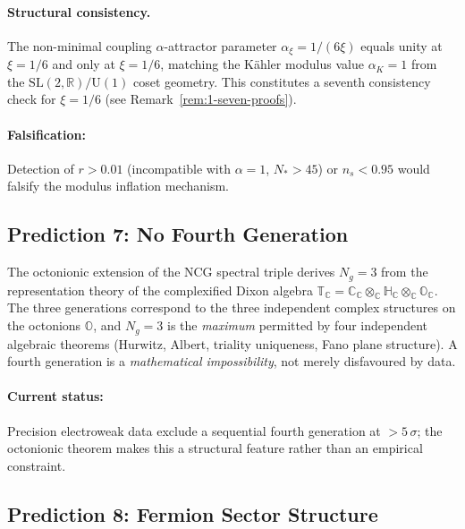\paragraph{Structural consistency.} The non-minimal coupling $\alpha$-attractor parameter $\alpha_\xi = 1/(6\xi)$ equals unity at $\xi = 1/6$ and only at $\xi = 1/6$, matching the K\"ahler modulus value $\alpha_K = 1$ from the $\mathrm{SL}(2,\mathbb{R})/\mathrm{U}(1)$ coset geometry. This constitutes a seventh consistency check for $\xi = 1/6$ (see Remark~\ref{rem:1-seven-proofs}).

\paragraph{Falsification:} Detection of $r > 0.01$ (incompatible with $\alpha = 1$, $N_* > 45$) or $n_s < 0.95$ would falsify the modulus inflation mechanism.

\subsection{Prediction 7: No Fourth Generation}
\label{sec:1-pred7}

The octonionic extension of the NCG spectral triple derives $N_g = 3$ from the representation theory of the complexified Dixon algebra $\mathbb{T}_{\mathbb{C}} = \mathbb{C}_{\mathbb{C}} \otimes_{\mathbb{C}} \mathbb{H}_{\mathbb{C}} \otimes_{\mathbb{C}} \mathbb{O}_{\mathbb{C}}$. The three generations correspond to the three independent complex structures on the octonions $\mathbb{O}$, and $N_g = 3$ is the \emph{maximum} permitted by four independent algebraic theorems (Hurwitz, Albert, triality uniqueness, Fano plane structure). A fourth generation is a \emph{mathematical impossibility}, not merely disfavoured by data.

\paragraph{Current status:} Precision electroweak data exclude a sequential fourth generation at $>5\,\sigma$; the octonionic theorem makes this a structural feature rather than an empirical constraint.

\subsection{Prediction 8: Fermion Sector Structure}
\label{sec:1-pred8}

